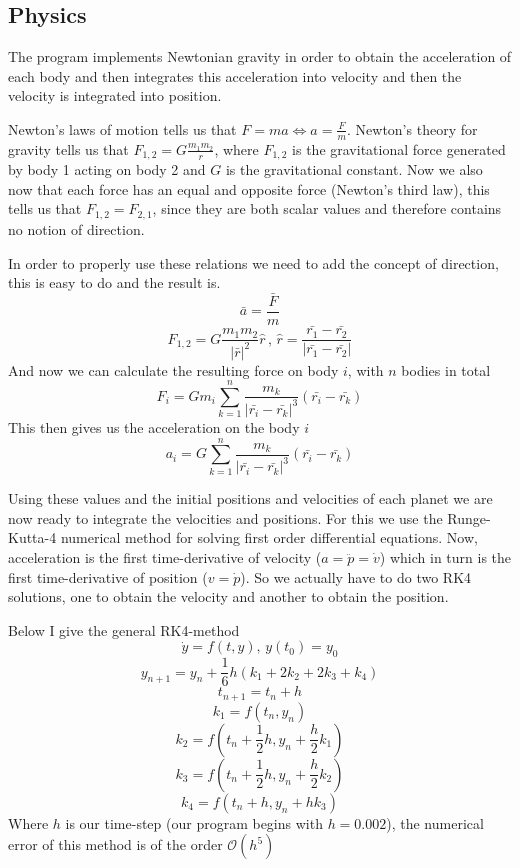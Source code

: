 \documentclass[a4paper,12pt]{article} \usepackage{graphicx}
\begin{document}
\subsection{Physics}
The program implements Newtonian gravity in order to obtain the acceleration of each body and then integrates this acceleration into velocity and then the velocity is integrated into position.

Newton's laws of motion tells us that $F=ma \Leftrightarrow a = \frac{F}{m}$. Newton's theory for gravity tells us that $F_{1,2} = G\frac{m_1m_2}{r}$, where $F_{1,2}$ is the gravitational force generated by body 1 acting on body 2 and $G$ is the gravitational constant. Now we also now that each force has an equal and opposite force (Newton's third law), this tells us that $F_{1,2} = F_{2,1}$, since they are both scalar values and therefore contains no notion of direction.

In order to properly use these relations we need to add the concept of direction, this is easy to do and the result is.
\[
\bar{a} = \frac{\bar{F}}{m}
\]
\[
F_{1,2} = G\frac{m_1m_2}{|\bar{r}|^2}\hat{r} \, , \, \hat{r} = \frac{\bar{r_1} - \bar{r_2}}{|\bar{r_1} - \bar{r_2}|}
\]
And now we can calculate the resulting force on body $i$, with $n$ bodies in total
\[
F_i = G m_i\sum_{k=1}^n \frac{m_k}{|\bar{r_i} - \bar{r_k}|^3}\left( \bar{r_i} - \bar{r_k} \right)
\]
This then gives us the acceleration on the body $i$
\[
a_i = G \sum_{k=1}^n \frac{m_k}{|\bar{r_i} - \bar{r_k}|^3}\left( \bar{r_i} - \bar{r_k} \right)
\]

Using these values and the initial positions and velocities of each planet we are now ready to integrate the velocities and positions. For this we use the Runge-Kutta-4 numerical method for solving first order differential equations. Now, acceleration is the first time-derivative of velocity ($a=\ddot{p} = \dot{v}$) which in turn is the first time-derivative of position ($v=\dot{p}$). So we actually have to do two RK4 solutions, one to obtain the velocity and another to obtain the position.

Below I give the general RK4-method
\[
\dot{y}=f(t,y),\,y(t_0)=y_0
\]
\[
y_{n+1} = y_n + \frac{1}{6}h\left( k_1 + 2k_2 + 2k_3 + k_4\right)
\]
\[
t_{n+1} = t_n +h
\]
\[
k_1 = f(t_n,y_n)
\]
\[
k_2 = f(t_n + \frac{1}{2}h,y_n + \frac{h}{2}k_1)
\]
\[
k_3 = f(t_n + \frac{1}{2}h,y_n + \frac{h}{2}k_2)
\]
\[
k_4 = f(t_n + h,y_n + hk_3)
\]
Where $h$ is our time-step (our program begins with $h = 0.002$), the numerical error of this method is of the order $\mathcal{O}(h^5)$
\end{document}
